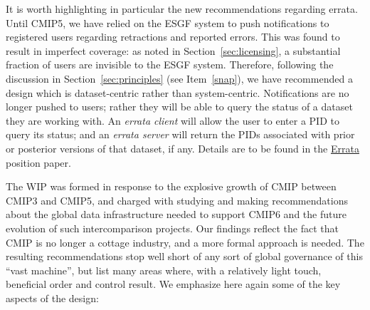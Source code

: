 \documentclass[gmd,manuscript]{copernicus}
\newcommand{\secref}[1] {\mbox{Section  \ref{sec:#1}}}
\begin{document}
It is worth highlighting in particular the new recommendations
regarding errata. Until CMIP5, we have relied on the ESGF system to
push notifications to registered users regarding retractions and
reported errors. This was found to result in imperfect coverage: as
noted in \secref{licensing}, a substantial fraction of users are
invisible to the ESGF system. Therefore, following the discussion in
\secref{principles} (see Item~\ref{snap}), we have recommended a
design which is dataset-centric rather than system-centric.
Notifications are no longer pushed to users; rather they will be able to
query the status of a dataset they are working with. An
\emph{errata client} will allow the user to enter a PID to query its
status; and an \emph{errata server} will return the PIDs associated
with prior or posterior versions of that dataset, if any. Details are
to be found in the \href{https://goo.gl/qjs8WK}{Errata} position
paper.

\label{sec:summary}

The WIP was formed in response to the explosive growth of CMIP between
CMIP3 and CMIP5, and charged with studying and making recommendations
about the global data infrastructure needed to support CMIP6 and the
future evolution of such intercomparison projects.
Our findings reflect the fact that CMIP is no longer
a cottage industry, and a more formal approach is needed. The resulting
recommendations stop well short of any sort of global governance of
this ``vast machine'', but list many areas where, with a relatively
light touch, beneficial order and control result. We
emphasize here again some of the key aspects of the design:
\end{document}
